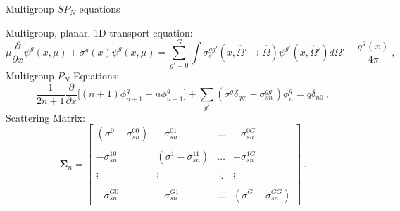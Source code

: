 \documentclass{beamer}
\begin{document}
\begin{frame}{Multigroup $SP_N$ equations}

  {\small
    Multigroup, planar, 1D transport equation:
    \begin{equation}
      \mu \frac{\partial}{\partial x} \psi^g(x,\mu) + \sigma^g(x)
      \psi^g(x,\mu) = \sum_{g'=0}^{G} \int
      \sigma_s^{gg'}(x,\hat{\Omega}' \rightarrow \hat{\Omega})
      \psi^{g'}(x,\hat{\Omega}') d\Omega' + \frac{q^g(x)}{4 \pi}\:,
      \label{eq:cart_1d_multigroup}
    \end{equation}
  }
  {\small
    Multigroup $P_N$ Equations:
    \begin{equation}
      \frac{1}{2n+1} \frac{\partial}{\partial x}\Big[ (n+1) \phi^g_{n+1}
        + n \phi^g_{n-1} \Big] +
      \sum_{g'}(\sigma^g\delta_{gg'}-\sigma^{gg'}_{sn}) \phi^g_n =
      q\delta_{n0} \:,
      \label{eq:multigroup_pn_equations}
    \end{equation}
  }
  {\small Scattering Matrix:}
  {\tiny
    \begin{equation}
      \mathbf{\Sigma}_n =
      \begin{bmatrix}
        (\sigma^0-\sigma_{sn}^{00}) & -\sigma_{sn}^{01} & \dots &
        -\sigma_{sn}^{0G} \\ &&&\\ -\sigma_{sn}^{10} &
        (\sigma^1-\sigma_{sn}^{11}) & \dots & -\sigma_{sn}^{1G}
        \\ &&&\\ \vdots & \vdots & \ddots & \vdots
        \\ &&&\\ -\sigma_{sn}^{G0} & -\sigma_{sn}^{G1} & \dots &
        (\sigma^G-\sigma_{sn}^{GG})
      \end{bmatrix}\:.
    \end{equation}
  }

\end{frame}
\end{document}
